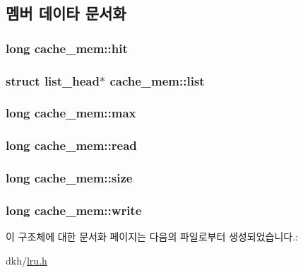 \subsection{멤버 데이타 문서화}
\hypertarget{structcache__mem_a2b8742701cf4beaff0639d36d52209d9}{
\subsubsection[{hit}]{\setlength{\rightskip}{0pt plus 5cm}long cache\+\_\+mem\+::hit}}\label{structcache__mem_a2b8742701cf4beaff0639d36d52209d9}
\hypertarget{structcache__mem_a785dde86afb87f8825779f50e29d6bd7}{
\subsubsection[{list}]{\setlength{\rightskip}{0pt plus 5cm}struct {\bf list\+\_\+head}$\ast$ cache\+\_\+mem\+::list}}\label{structcache__mem_a785dde86afb87f8825779f50e29d6bd7}
\hypertarget{structcache__mem_aca41dfab3073387e6c6063457a17f616}{
\subsubsection[{max}]{\setlength{\rightskip}{0pt plus 5cm}long cache\+\_\+mem\+::max}}\label{structcache__mem_aca41dfab3073387e6c6063457a17f616}
\hypertarget{structcache__mem_af64061b621392a1872f5cb92dde7dc7c}{
\subsubsection[{read}]{\setlength{\rightskip}{0pt plus 5cm}long cache\+\_\+mem\+::read}}\label{structcache__mem_af64061b621392a1872f5cb92dde7dc7c}
\hypertarget{structcache__mem_a58c6a91c40d59398a3ed18daccc448fc}{
\subsubsection[{size}]{\setlength{\rightskip}{0pt plus 5cm}long cache\+\_\+mem\+::size}}\label{structcache__mem_a58c6a91c40d59398a3ed18daccc448fc}
\hypertarget{structcache__mem_adb5a0315176779908235c7ed3e41ec57}{
\subsubsection[{write}]{\setlength{\rightskip}{0pt plus 5cm}long cache\+\_\+mem\+::write}}\label{structcache__mem_adb5a0315176779908235c7ed3e41ec57}


이 구조체에 대한 문서화 페이지는 다음의 파일로부터 생성되었습니다.\+:\begin{DoxyCompactItemize}
\item 
dkh/\hyperlink{lru_8h}{lru.\+h}\end{DoxyCompactItemize}
